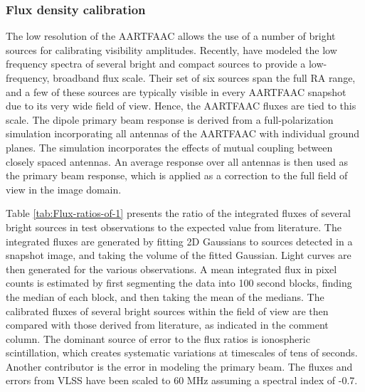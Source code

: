 \documentclass{aa}
\begin{document}
\subsubsection{Flux density calibration}

The low resolution of the AARTFAAC allows  the use of a number of bright sources
for calibrating  visibility amplitudes.  Recently,  \citet{scaife2012broad} have
modeled  the low  frequency spectra  of several  bright and  compact  sources to
provide a low-frequency, broadband flux scale. Their set of six sources span the
full  RA range,  and  a few  of these  sources  are typically  visible in  every
AARTFAAC  snapshot due  to its  very wide  field of  view.  Hence,  the AARTFAAC
fluxes are tied to this scale.  The dipole primary beam response is derived from
a full-polarization  simulation incorporating all antennas of  the AARTFAAC with
individual  ground planes.  The  simulation incorporates  the effects  of mutual
coupling between closely spaced antennas.  An average response over all antennas
is then used as  the primary beam response, which is applied  as a correction to
the full field of view in the image domain.

Table \ref{tab:Flux-ratios-of-1} presents the  ratio of the integrated fluxes of
several  bright  sources  in  test  observations  to  the  expected  value  from
literature.   The integrated  fluxes are  generated by  fitting 2D  Gaussians to
sources  detected in  a snapshot  image,  and taking  the volume  of the  fitted
Gaussian. Light curves  are then generated for the  various observations. A mean
integrated flux in  pixel counts is estimated by first  segmenting the data into
100 second blocks, finding the median of each block, and then taking the mean of
the medians.  The  calibrated fluxes of several bright  sources within the field
of view  are then compared with  those derived from literature,  as indicated in
the  comment  column.  The  dominant  source  of error  to  the  flux ratios  is
ionospheric scintillation, which creates  systematic variations at timescales of
tens  of seconds.   Another contributor  is the  error in  modeling  the primary
beam. The  fluxes and errors  from VLSS  have been scaled  to 60 MHz  assuming a
spectral index of -0.7.

\end{document}
